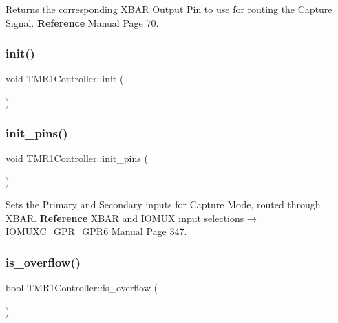 Returns the corresponding X\+B\+AR Output Pin to use for routing the Capture Signal. {\bfseries Reference} Manual Page 70. 

\mbox{\label{classTMR1Controller_af92315e340766e3857eb6a20e7cab673}} 
\subsubsection{\texorpdfstring{init()}{init()}}
{\footnotesize\ttfamily void T\+M\+R1\+Controller\+::init (\begin{DoxyParamCaption}{ }\end{DoxyParamCaption})\hspace{0.3cm}{\ttfamily [inline]}}

\mbox{\label{classTMR1Controller_a1c5d358760aa98641333f63c7bcacd3a}} 
\subsubsection{\texorpdfstring{init\+\_\+pins()}{init\_pins()}}
{\footnotesize\ttfamily void T\+M\+R1\+Controller\+::init\+\_\+pins (\begin{DoxyParamCaption}{ }\end{DoxyParamCaption})\hspace{0.3cm}{\ttfamily [inline]}}



Sets the Primary and Secondary inputs for Capture Mode, routed through X\+B\+AR. {\bfseries Reference} X\+B\+AR and I\+O\+M\+UX input selections → I\+O\+M\+U\+X\+C\+\_\+\+G\+P\+R\+\_\+\+G\+P\+R6 Manual Page 347. 

\mbox{\label{classTMR1Controller_a06052b4a881156be3c7a4b6495d8ca11}} 
\subsubsection{\texorpdfstring{is\+\_\+overflow()}{is\_overflow()}}
{\footnotesize\ttfamily bool T\+M\+R1\+Controller\+::is\+\_\+overflow (\begin{DoxyParamCaption}{ }\end{DoxyParamCaption})\hspace{0.3cm}{\ttfamily [inline]}}



